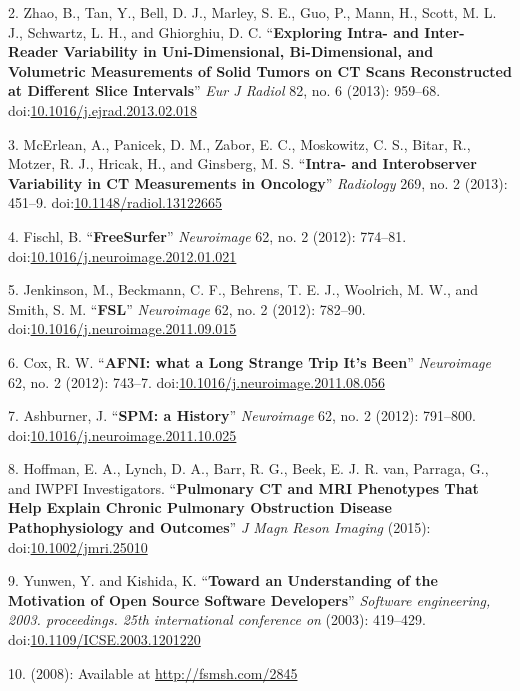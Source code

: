 \documentclass[11pt,]{article}
\begin{document}
2. Zhao, B., Tan, Y., Bell, D. J., Marley, S. E., Guo, P., Mann, H.,
Scott, M. L. J., Schwartz, L. H., and Ghiorghiu, D. C.
``\textbf{Exploring Intra- and Inter-Reader Variability in
Uni-Dimensional, Bi-Dimensional, and Volumetric Measurements of Solid
Tumors on CT Scans Reconstructed at Different Slice Intervals}''
\emph{Eur J Radiol} 82, no. 6 (2013): 959--68.
doi:\href{http://dx.doi.org/10.1016/j.ejrad.2013.02.018}{10.1016/j.ejrad.2013.02.018}

3. McErlean, A., Panicek, D. M., Zabor, E. C., Moskowitz, C. S., Bitar,
R., Motzer, R. J., Hricak, H., and Ginsberg, M. S. ``\textbf{Intra- and
Interobserver Variability in CT Measurements in Oncology}''
\emph{Radiology} 269, no. 2 (2013): 451--9.
doi:\href{http://dx.doi.org/10.1148/radiol.13122665}{10.1148/radiol.13122665}

4. Fischl, B. ``\textbf{FreeSurfer}'' \emph{Neuroimage} 62, no. 2
(2012): 774--81.
doi:\href{http://dx.doi.org/10.1016/j.neuroimage.2012.01.021}{10.1016/j.neuroimage.2012.01.021}

5. Jenkinson, M., Beckmann, C. F., Behrens, T. E. J., Woolrich, M. W.,
and Smith, S. M. ``\textbf{FSL}'' \emph{Neuroimage} 62, no. 2 (2012):
782--90.
doi:\href{http://dx.doi.org/10.1016/j.neuroimage.2011.09.015}{10.1016/j.neuroimage.2011.09.015}

6. Cox, R. W. ``\textbf{AFNI: what a Long Strange Trip It's Been}''
\emph{Neuroimage} 62, no. 2 (2012): 743--7.
doi:\href{http://dx.doi.org/10.1016/j.neuroimage.2011.08.056}{10.1016/j.neuroimage.2011.08.056}

7. Ashburner, J. ``\textbf{SPM: a History}'' \emph{Neuroimage} 62, no. 2
(2012): 791--800.
doi:\href{http://dx.doi.org/10.1016/j.neuroimage.2011.10.025}{10.1016/j.neuroimage.2011.10.025}

8. Hoffman, E. A., Lynch, D. A., Barr, R. G., Beek, E. J. R. van,
Parraga, G., and IWPFI Investigators. ``\textbf{Pulmonary CT and MRI
Phenotypes That Help Explain Chronic Pulmonary Obstruction Disease
Pathophysiology and Outcomes}'' \emph{J Magn Reson Imaging} (2015):
doi:\href{http://dx.doi.org/10.1002/jmri.25010}{10.1002/jmri.25010}

9. Yunwen, Y. and Kishida, K. ``\textbf{Toward an Understanding of the
Motivation of Open Source Software Developers}'' \emph{Software
engineering, 2003. proceedings. 25th international conference on}
(2003): 419--429.
doi:\href{http://dx.doi.org/10.1109/ICSE.2003.1201220}{10.1109/ICSE.2003.1201220}

10. (2008): Available at \url{http://fsmsh.com/2845}
\end{document}
